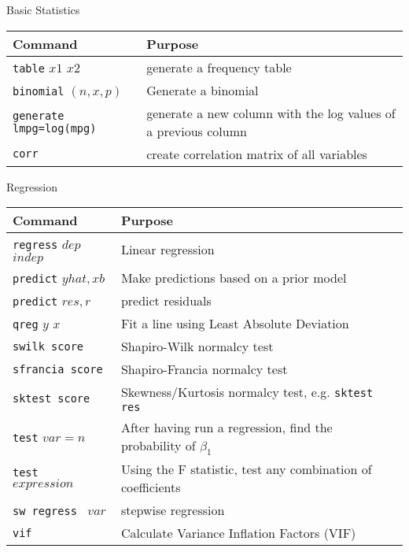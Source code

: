 \documentclass[11pt, oneside]{article}   	%
\begin{document}
\begin{center}
\large{Basic Statistics}
\end{center}

\begin{tabular}{l p{ } }
Command & Purpose \\
\hline
\texttt{table} $x1$ $x2$ & generate a frequency table \\

\texttt{binomial} $(n,x,p)$ & Generate a binomial \\

\texttt{generate lmpg=log(mpg)} & generate a new column with the log values of a previous column \\

\texttt{corr} & create correlation matrix of all variables \\

\end{tabular}



\begin{center}
\large{Regression}
\end{center}

\begin{tabular}{l p{ } }
Command & Purpose \\
\hline
\texttt{regress} $dep$ $indep$ & Linear regression \\ 

\texttt{predict} $yhat, xb$ & Make predictions based on a prior model \\

\texttt{predict} $res, r$ & predict residuals \\

\texttt{qreg} $y$ $x$ & Fit a line using Least Absolute Deviation \\

\texttt{swilk score} & Shapiro-Wilk normalcy test \\

\texttt{sfrancia score} & Shapiro-Francia normalcy test \\

\texttt{sktest score} & Skewness/Kurtosis normalcy test, e.g. \texttt{sktest res} \\

\texttt{test} $var=n$ & After having run a regression, find the probability of $\beta_1$ \\

\texttt{test } $expression$ & Using the F statistic, test any combination of coefficients \\

\texttt{sw regress } $var$ & stepwise regression\\

\texttt{vif}  & Calculate Variance Inflation Factors (VIF) \\


\end{tabular}
\end{document}
